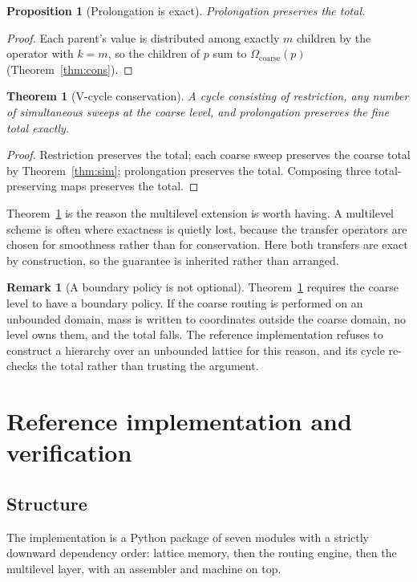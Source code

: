 \documentclass[11pt,a4paper]{article}
\newtheorem{theorem}{Theorem}
\newtheorem{proposition}{Proposition}
\theoremstyle{definition}
\newtheorem{remark}{Remark}
\newcommand{\Om}{\Omega}
\begin{document}
\begin{proposition}[Prolongation is exact]
Prolongation preserves the total.
\end{proposition}
\begin{proof}
Each parent's value is distributed among exactly $m$ children by the operator
with $k = m$, so the children of $p$ sum to $\Om_{\mathrm{coarse}}(p)$
(Theorem~\ref{thm:cons}).
\end{proof}

\begin{theorem}[V-cycle conservation]\label{thm:vcycle}
A cycle consisting of restriction, any number of simultaneous sweeps at the
coarse level, and prolongation preserves the fine total exactly.
\end{theorem}
\begin{proof}
Restriction preserves the total; each coarse sweep preserves the coarse total
by Theorem~\ref{thm:sim}; prolongation preserves the total. Composing three
total-preserving maps preserves the total.
\end{proof}

Theorem~\ref{thm:vcycle} is the reason the multilevel extension is worth having.
A multilevel scheme is often where exactness is quietly lost, because the
transfer operators are chosen for smoothness rather than for conservation. Here
both transfers are exact by construction, so the guarantee is inherited rather
than arranged.

\begin{remark}[A boundary policy is not optional]
Theorem~\ref{thm:vcycle} requires the coarse level to have a boundary policy.
If the coarse routing is performed on an unbounded domain, mass is written to
coordinates outside the coarse domain, no level owns them, and the total falls.
The reference implementation refuses to construct a hierarchy over an unbounded
lattice for this reason, and its cycle re-checks the total rather than
trusting the argument.
\end{remark}

\section{Reference implementation and verification}\label{sec:impl}

\subsection{Structure}

The implementation is a Python package of seven modules with a strictly
downward dependency order: lattice memory, then the routing engine, then the
multilevel layer, with an assembler and machine on top.
\end{document}
